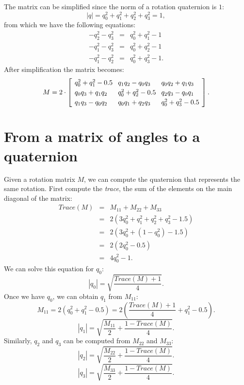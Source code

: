 \documentclass[11pt,a4paper]{report}
\newcommand*{\spacearray}{
\renewcommand{\arraystretch}{1.2}
\setlength{\arraycolsep}{4pt}
}
\begin{document}
The matrix can be simplified since the norm of a rotation quaternion is $1$:
\begin{displaymath}
|q| = q_0^2+q_1^2+q_2^2+q_3^2 = 1,
\end{displaymath}
from which we have the following equations:
\begin{eqnarray*}
-q_2^2-q_3^2 &=& q_0^2+q_1^2-1\\
-q_1^2-q_3^2 &=& q_0^2+q_2^2-1\\
-q_1^2-q_2^2 &=& q_0^2+q_3^2-1.
\end{eqnarray*}
After simplification the matrix becomes:
\begin{displaymath}
\spacearray
M=
2\cdot\left[
\begin{array}{lll}
q_0^2+q_1^2-0.5 & q_1q_2-q_0q_3 & q_0q_2+q_1q_3\\
q_0q_3+q_1q_2 & q_0^2+q_2^2-0.5 & q_2q_3-q_0q_1\\
q_1q_3-q_0q_2 & q_0q_1+q_2q_3 & q_0^2+q_3^2-0.5\\
\end{array}
\right].
\end{displaymath}

\section{From a matrix of angles to a quaternion}\label{s.mtoq}

Given a rotation matrix $M$, we can compute the quaternion that represents the same rotation. First compute the \emph{trace}, the sum of the elements on the main diagonal of the matrix:
\begin{eqnarray*}
\textit{Trace}(M)&=&M_{11}+M_{22}+M_{33}\\
&=&2(3q_0^2+q_1^2+q_2^2+q_3^2-1.5)\\
&=&2(3q_0^2+(1-q_0^2)-1.5)\\
&=&2(2q_0^2-0.5)\\
&=&4q_0^2-1.
\end{eqnarray*}
We can solve this equation for $q_0$:
\begin{displaymath}
|q_0|=\sqrt{\frac{\textit{Trace}(M)+1}{4}}.
\end{displaymath}
Once we have $q_0$, we can obtain $q_1$ from $M_{11}$:
\begin{displaymath}
M_{11} = 2(q_0^2+q_1^2-0.5)=2\left(\frac{\textit{Trace}(M)+1}{4}+q_1^2-0.5\right).
\end{displaymath}
\begin{displaymath}
|q_1|=\sqrt{\frac{M_{11}}{2}+\frac{1-\textit{Trace}(M)}{4}}.
\end{displaymath}
Similarly, $q_2$ and $q_3$ can be computed from $M_{22}$ and $M_{33}$:
\begin{displaymath}
|q_2|=\sqrt{\frac{M_{22}}{2}+\frac{1-\textit{Trace}(M)}{4}}.
\end{displaymath}
\begin{displaymath}
|q_3|=\sqrt{\frac{M_{33}}{2}+\frac{1-\textit{Trace}(M)}{4}}.
\end{displaymath}
\end{document}

